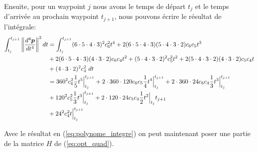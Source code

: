 Ensuite, pour un waypoint $j$ nous avons le temps de départ $t_j$ et le temps d'arrivée au prochain waypoint $t_{j+1}$, nous pouvons écrire le résultat de l'intégrale:
\begin{align}\label{eq:polynome_integre}
\int_{t_j}^{t_{j+1}} \left\lVert\frac{d^4 \boldsymbol{p}}{dt^4}\right\rVert^2 dt
	& = \int_{t_j}^{t_{j+1}} (6\cdot 5\cdot 4\cdot 3)^2 c_6^2 t^4 + 2(6\cdot 5\cdot 4\cdot 3)(5 \cdot 4\cdot 3\cdot 2) c_6 c_5 t^3 \\
	&	+ 2(6 \cdot 5 \cdot 4\cdot 3)(4\cdot 3\cdot 2)c_6 c_4 t^2 + (5 \cdot 4\cdot 3\cdot 2)^2 c_5^2 t^2 + 2(5 \cdot 4\cdot 3\cdot 2)(4\cdot 3\cdot 2)c_5 c_4 t \nonumber \\
	&	+ (4\cdot 3\cdot 2)^2 c_4^2 \ dt\nonumber \\
	&=	360^2 c_6^2 \frac{1}{5} t^5 \Big|_{t_j}^{t_{j+1}}
		+ 2 \cdot 360 \cdot 120 c_6 c_5 \frac{1}{4} t^4\Big|_{t_j}^{t_{j+1}}
		+ 2 \cdot 360 \cdot 24 c_6 c_4 \frac{1}{3} t^3\Big|_{t_j}^{t_{j+1}} \nonumber \\
	&	+ 120^2 c_5^2 \frac{1}{3} t^3\Big|_{t_j}^{t_{j+1}} + 2 \cdot 120 \cdot 24 c_5 c_4 \frac{1}{2}t^2 \Big|_{t_j}{t_{j+1}} \nonumber \\
	&	+ 24^2 c_4^2 t\Big|_{t_j}^{t_{j+1}} \nonumber
\end{align}


Avec le résultat en (\ref{eq:polynome_integre}) on peut maintenant poser une partie de la matrice $H$ de (\ref{eq:opt_quad}).

